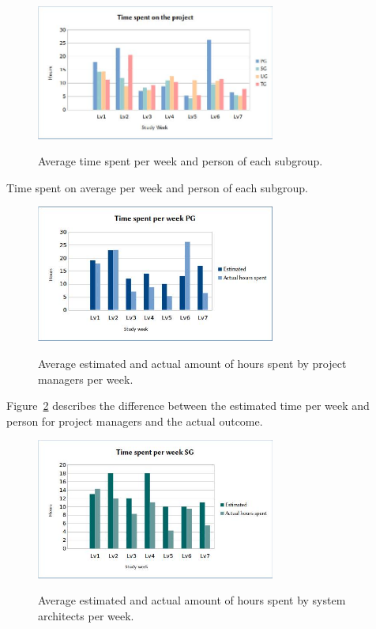 \documentclass[a4paper]{article}
\begin{document}
\begin{figure}[h!]
\centering
\includegraphics[width=0.7\textwidth]{time.jpg}
\label{fig:time}
\caption{Average time spent per week and person of each subgroup.}
\end{figure}
Time spent on average per week and person of each subgroup.

\begin{figure}[h!]
\centering
\includegraphics[width=0.7\textwidth]{pg.jpg}
\label{fig:pg}
\caption{Average estimated and actual amount of hours spent by project managers per week.}
\end{figure}
Figure~\ref{fig:pg} describes the difference between the estimated time per week and person for project managers and the actual outcome. 

\begin{figure}[h!]
\centering
\includegraphics[width=0.7\textwidth]{sg.jpg}
\label{fig:sg}
\caption{Average estimated and actual amount of hours spent by system architects per week.}
\end{figure}
\end{document}
